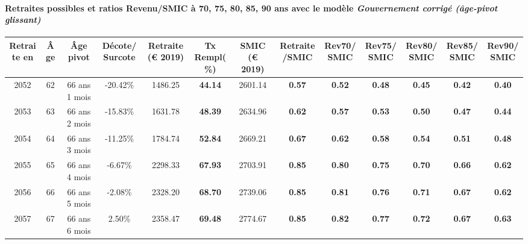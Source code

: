 \paragraph{Retraites possibles et ratios Revenu/SMIC à 70, 75, 80, 85, 90 ans avec le modèle \emph{Gouvernement corrigé (âge-pivot glissant)}}  
 
{ \scriptsize \begin{center} 
\begin{tabular}[htb]{|c|c||c|c||c|c||c||c|c|c|c|c|c|} 
\hline 
 Retraite en &  Âge &  Âge pivot &  Décote/Surcote &  Retraite (\euro{} 2019) &  Tx Rempl(\%) &  SMIC (\euro{} 2019) &  Retraite/SMIC &  Rev70/SMIC &  Rev75/SMIC &  Rev80/SMIC &  Rev85/SMIC &  Rev90/SMIC \\ 
\hline \hline 
 2052 &  62 &  66 ans 1 mois &  -20.42\% &  1486.25 &  {\bf 44.14} &  2601.14 &  {\bf {\color{red} 0.57}} &  {\bf {\color{red} 0.52}} &  {\bf {\color{red} 0.48}} &  {\bf {\color{red} 0.45}} &  {\bf {\color{red} 0.42}} &  {\bf {\color{red} 0.40}} \\ 
\hline 
 2053 &  63 &  66 ans 2 mois &  -15.83\% &  1631.78 &  {\bf 48.39} &  2634.96 &  {\bf {\color{red} 0.62}} &  {\bf {\color{red} 0.57}} &  {\bf {\color{red} 0.53}} &  {\bf {\color{red} 0.50}} &  {\bf {\color{red} 0.47}} &  {\bf {\color{red} 0.44}} \\ 
\hline 
 2054 &  64 &  66 ans 3 mois &  -11.25\% &  1784.74 &  {\bf 52.84} &  2669.21 &  {\bf {\color{red} 0.67}} &  {\bf {\color{red} 0.62}} &  {\bf {\color{red} 0.58}} &  {\bf {\color{red} 0.54}} &  {\bf {\color{red} 0.51}} &  {\bf {\color{red} 0.48}} \\ 
\hline 
 2055 &  65 &  66 ans 4 mois &  -6.67\% &  2298.33 &  {\bf 67.93} &  2703.91 &  {\bf {\color{red} 0.85}} &  {\bf {\color{red} 0.80}} &  {\bf {\color{red} 0.75}} &  {\bf {\color{red} 0.70}} &  {\bf {\color{red} 0.66}} &  {\bf {\color{red} 0.62}} \\ 
\hline 
 2056 &  66 &  66 ans 5 mois &  -2.08\% &  2328.20 &  {\bf 68.70} &  2739.06 &  {\bf {\color{red} 0.85}} &  {\bf {\color{red} 0.81}} &  {\bf {\color{red} 0.76}} &  {\bf {\color{red} 0.71}} &  {\bf {\color{red} 0.67}} &  {\bf {\color{red} 0.62}} \\ 
\hline 
 2057 &  67 &  66 ans 6 mois &  2.50\% &  2358.47 &  {\bf 69.48} &  2774.67 &  {\bf {\color{red} 0.85}} &  {\bf {\color{red} 0.82}} &  {\bf {\color{red} 0.77}} &  {\bf {\color{red} 0.72}} &  {\bf {\color{red} 0.67}} &  {\bf {\color{red} 0.63}} \\ 
\hline 
\hline 
\end{tabular} 
\end{center} } 
